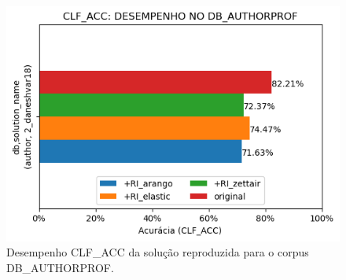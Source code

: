 \begin{figure}[h]
    \centering
    \caption{Desempenho CLF\_ACC da solução reproduzida para o corpus DB\_AUTHORPROF.}
    \vspace{-0.5cm}
    \begin{center}
        \includegraphics[scale=0.75]{img/clf-acc-bars-authorprof.png}
    \end{center}
    \vspace{-0.5cm}
    \label{fig:clf-acc-bars-authorprof}
\end{figure}